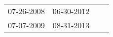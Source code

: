 \begin{supertabular}{llll}
 07-26-2008 &  06-30-2012 \\
 07-07-2009 &  08-31-2013 \\
\end{supertabular}
